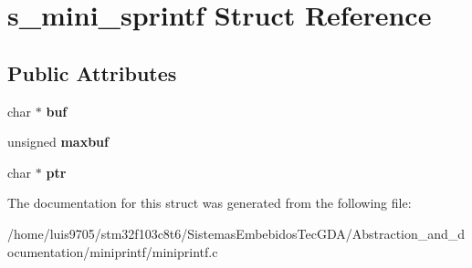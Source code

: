 \hypertarget{structs__mini__sprintf}{}\section{s\+\_\+mini\+\_\+sprintf Struct Reference}
\label{structs__mini__sprintf}
\subsection*{Public Attributes}
\begin{DoxyCompactItemize}
\item 
\mbox{\label{structs__mini__sprintf_a283977d644aa5766b9a073326cead04a}} 
char $\ast$ {\bfseries buf}
\item 
\mbox{\label{structs__mini__sprintf_aa72d7f12a63aac86d0fb8efca58d2508}} 
unsigned {\bfseries maxbuf}
\item 
\mbox{\label{structs__mini__sprintf_a2c9e792452e1d01c6315f7880d158d0a}} 
char $\ast$ {\bfseries ptr}
\end{DoxyCompactItemize}


The documentation for this struct was generated from the following file\+:\begin{DoxyCompactItemize}
\item 
/home/luis9705/stm32f103c8t6/\+Sistemas\+Embebidos\+Tec\+G\+D\+A/\+Abstraction\+\_\+and\+\_\+documentation/miniprintf/miniprintf.\+c\end{DoxyCompactItemize}
